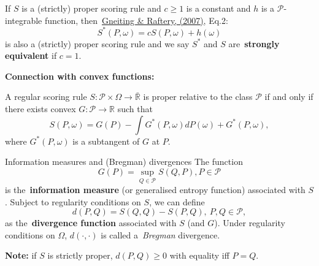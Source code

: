 \begin{frame}
 \begin{definition}
 If $S$ is a (strictly) proper scoring rule and $c\geq1$ is a constant and $h$ is a $\mathcal{P}$-integrable function, then~\href{https://sites.stat.washington.edu/raftery/Research/PDF/Gneiting2007jasa.pdf}{Gneiting \& Raftery, (2007)}, Eq.2: 
 \begin{equation}
  \label{eq:strongly_equiv}
  S^\ast(P, \omega) = c S(P, \omega) + h(\omega)
 \end{equation}
is also a (strictly) proper scoring rule and we say $S^\ast$ and $S$ are~\textbf{strongly equivalent} if $c = 1$.
\end{definition}
\textbf{Connection with convex functions:}
% 
\begin{theorem}
 A regular scoring rule $S: \mathcal{P}\times \Omega \to \bar{\mathbb{R}}$ is proper relative to the class $\mathcal{P}$ if and only if there exists convex $G : \mathcal{P} \to \mathbb{R}$ such that
 \begin{equation*}
  S(P, \omega) = G(P) - \int G^\ast (P, \omega)dP(\omega) + G^\ast(P, \omega),
 \end{equation*}
where $G^\ast(P, \omega)$ is a subtangent of $G$ at $P$.
\end{theorem}
\end{frame}
\begin{frame}{Information measures and (Bregman) divergences}
 The function 
 \begin{equation}
  G(P) = \sup_{Q \in \mathcal{P}} S(Q, P), P \in \mathcal{P}
 \end{equation}
 is the~\textbf{information measure} (or generalised entropy function) associated with $S$.
 Subject to regularity conditions on $S$, we can define
 \begin{equation}
 d(P, Q) = S(Q, Q) - S(P, Q),\: P,Q \in \mathcal{P},
\end{equation}
as the~\textbf{divergence function} associated with $S$ (and $G$).
Under regularity conditions on $\Omega$, $d(\cdot, \cdot)$ is called a~\textit{Bregman} divergence.

\textbf{Note:} if $S$ is strictly proper, $d(P, Q) \geq 0$ with equality iff $P = Q$.
\end{frame}
